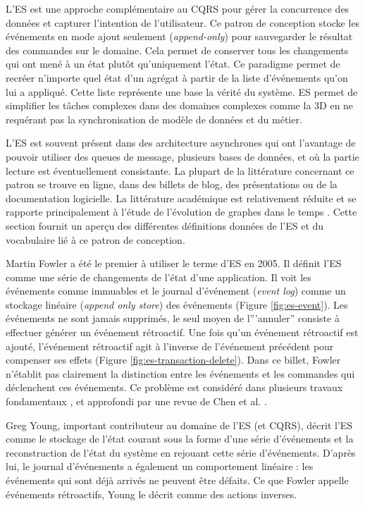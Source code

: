 L'\gls{ES} est une approche complémentaire au \gls{CQRS} pour 
gérer la 
concurrence des données et capturer l'intention de l'utilisateur. Ce patron de 
conception stocke les événements en mode ajout seulement 
(\textit{append-only}) pour sauvegarder le résultat des commandes sur le 
domaine. Cela permet de conserver tous les changements qui ont mené à un 
état plutôt qu'uniquement l'état. Ce paradigme permet de recréer n'importe quel 
état d'un agrégat à partir de la liste d'événements qu'on lui a appliqué. Cette 
liste représente une base la vérité du système. 
\gls{ES} permet de simplifier les tâches complexes dans des 
domaines complexes comme la \gls{3D} en ne requérant pas la synchronisation de 
modèle de données et du métier. 

L'\gls{ES} est souvent présent dans des architecture asynchrones qui ont 
l'avantage de pouvoir utiliser des queues de message, plusieurs bases de 
données, et où la partie lecture est éventuellement consistante.
La plupart de la littérature concernant ce patron se trouve en ligne, dans des 
billets de blog, des présentations ou de la documentation logicielle. La 
littérature académique est relativement réduite et se rapporte principalement
à l'étude de l'évolution de graphes dans le temps \cite{Erb2015,Erb2017}. Cette section fournit un aperçu des différentes 
définitions données de l'\gls{ES} et du vocabulaire lié à ce patron de conception.

Martin Fowler a été le premier à utiliser le terme 
d'\acrlong{ES} en 2005. Il définit l'\gls{ES} comme \og une série de 
changements 
de l'état d'une application\fg{}. Il voit les événements 
comme immuables et le journal d'événement (\textit{event log}) comme un 
stockage linéaire (\textit{append only store}) des événements (Figure 
\ref{fig:es-event}). 
Les événements ne sont jamais supprimés, le seul moyen de l'''annuler'' consiste à 
effectuer générer un événement rétroactif. 
Une fois qu'un événement rétroactif est ajouté, l'événement rétroactif agit à 
l'inverse de l'événement précédent pour compenser ses effets (Figure 
\ref{fig:es-transaction-delete}). 
Dans ce billet, Fowler n'établit pas clairement la distinction entre les 
événements 
et les commandes qui déclenchent ces événements. Ce problème est 
considéré dans plusieurs travaux fondamentaux \cite{Prakash1994,Sun2002,Weiss2009a,Weiss2010}, et approfondi par une revue de Chen et al. \cite{Cheng2013}.

Greg Young, important contributeur au domaine de l'\gls{ES} (et \gls{CQRS}), décrit l'\gls{ES} comme \og le stockage de l'état courant sous la forme 
d'une série d'événements et la reconstruction de l'état du système en rejouant 
cette série d'événements\fg{}. D'après lui, le journal d'événements a également 
un comportement linéaire : les événements qui sont déjà arrivés ne peuvent 
être défaits. Ce que Fowler appelle événements rétroactifs, Young le décrit 
comme des actions inverses.

